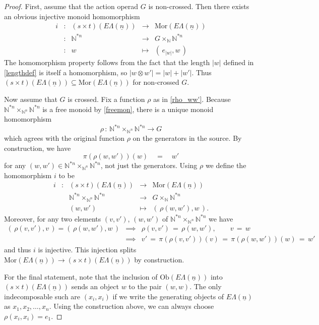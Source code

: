 \documentclass{amsbook} %
\newcommand{\ELn}{E\Lambda(\underline{n})}
\numberwithin{section}{chapter}
\begin{document}
\begin{proof}
First, assume that the action operad $G$ is non-crossed. Then there exists an obvious injective monoid homomorphism
\[ \begin{array}{rlrll}
			i & : & (s \times t)(\ELn) & \to & \mathrm{Mor}(\ELn) \\
			& : & \mathbb{N}^{\ast n} & \to & G \times_{\mathbb{N}} \mathbb{N}^{\ast n} \\
			& : & w & \mapsto & ( \, e_{|w|}, w \, )
		\end{array}
\]
The homomorphism property follows from the fact that the length $|w|$ defined in \cref{lengthdef} is itself a homomorphism, so $|w \otimes w'| = |w|+|w'|$. Thus $(s \times t)(\ELn) \subseteq \mathrm{Mor}(\ELn)$ for non-crossed $G$.

Now assume that $G$ is crossed. Fix a function $\rho$ as in \cref{rho_ww'}. Because $\mathbb{N}^{\ast n} \times_{\mathbb{N}^n} \mathbb{N}^{\ast n}$ is a free monoid  by \cref{freemon}, there is a unique monoid homomorphism
\[ \rho \, : \, \mathbb{N}^{\ast n} \times_{\mathbb{N}^n} \mathbb{N}^{\ast n} \longrightarrow G \]
which agrees with the original function $\rho$ on the generators in the source. By construction, we have
\[ \pi(\rho(w, w'))(w) \quad = \quad w' \]
for any $(w, w') \in\mathbb{N}^{\ast n} \times_{\mathbb{N}^n} \mathbb{N}^{\ast n}$, not just the generators. Using $\rho$ we define the homomorphism $i$ to be
\[ \begin{array}{rlrll}
			i & : & (s \times t)(\ELn) & \to & \mathrm{Mor}(\ELn) \\
			&  & \mathbb{N}^{\ast n} \times_{\mathbb{N}^n} \mathbb{N}^{\ast n} & \to & G \times_{\mathbb{N}} \mathbb{N}^{\ast n} \\
			&  & (w, w') & \mapsto & ( \, \rho(w, w'), w \, ).
		\end{array}
\]
Moreover, for any two elements $(v, v')$, $(w, w')$ of $\mathbb{N}^{\ast n} \times_{\mathbb{N}^n} \mathbb{N}^{\ast n}$ we have
\[ \begin{array}{lcl}
		( \, \rho(v, v'), v \, )  =  ( \, \rho(w, w'), w \, ) & \implies & \rho(v, v') \, = \, \rho(w, w'), \quad \quad v \, = \, w \\
		 & \implies & v' \, = \, \pi(\rho(v, v'))(v) \, = \, \pi(\rho(w, w'))(w) \, = \, w'
		\end{array}
\]
and thus $i$ is injective. This injection splits $\mathrm{Mor}(\ELn) \to (s \times t)(\ELn)$ by construction.

For the final statement, note that the inclusion of $\mathrm{Ob}(\ELn)$ into $(s \times t)(\ELn)$ sends an object $w$ to the pair $(w,w)$. The only indecomposable such are $(x_i, x_i)$ if we write the generating objects of $\ELn$ as $x_1, x_2, \ldots, x_n$. Using the construction above, we can always choose $\rho(x_i, x_i) = e_1$.
\end{proof}
\end{document}

